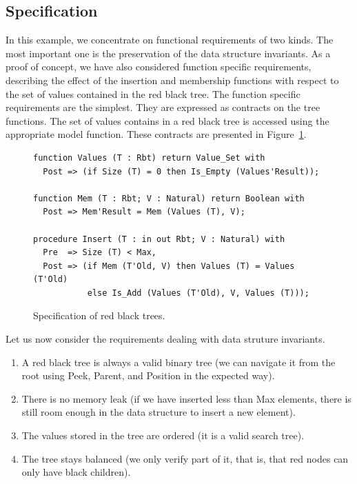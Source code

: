 \documentclass[11pt,a4paper]{article}
\begin{document}
\subsection{Specification}

In this example, we concentrate on functional requirements of two kinds. The most important one is the
preservation of the data structure invariants. As a proof of concept, we have also considered
function specific requirements, describing the effect of the insertion and membership functions with
respect to the set of values contained in the red black tree. The function specific requirements are the
simplest. They are expressed as contracts on the tree functions. The set of values contains in a red black
tree is accessed using the appropriate model function. These contracts are presented in
Figure~\ref{fig-rbt-spec}.

\begin{figure}[ht]
\begin{small}
\begin{lstlisting}
function Values (T : Rbt) return Value_Set with
  Post => (if Size (T) = 0 then Is_Empty (Values'Result));

function Mem (T : Rbt; V : Natural) return Boolean with
  Post => Mem'Result = Mem (Values (T), V);

procedure Insert (T : in out Rbt; V : Natural) with
  Pre  => Size (T) < Max,
  Post => (if Mem (T'Old, V) then Values (T) = Values (T'Old)
           else Is_Add (Values (T'Old), V, Values (T)));
\end{lstlisting}
\end{small}
\caption{\label{fig-rbt-spec} Specification of red black trees.}
\end{figure}

Let us now consider the requirements dealing with data struture invariants.

\begin{enumerate}
 \item A red black tree is always a valid binary tree (we can navigate it from the root using Peek, Parent,
 and Position in the expected way).
 \item There is no memory leak (if we have inserted less than Max elements, there is still room enough in the
 data structure to insert a new element).
 \item The values stored in the tree are ordered (it is a valid search tree).
 \item The tree stays balanced (we only verify part of it, that is, that red nodes can only have black children).
\end{enumerate}
\end{document}
